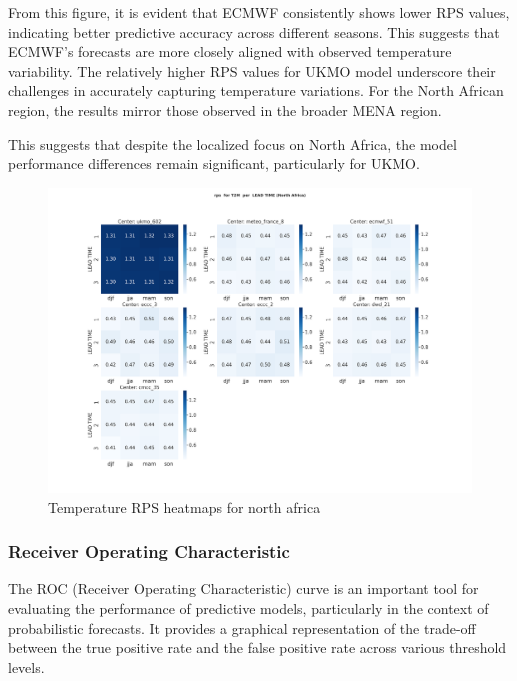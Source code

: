 From this figure, it is evident that ECMWF consistently shows lower RPS values, indicating better predictive accuracy across different seasons. This suggests that ECMWF's forecasts are more closely aligned with observed temperature variability. The relatively higher RPS values for  UKMO model underscore their challenges in accurately capturing temperature variations. 
For the North African region, the results mirror those observed in the broader MENA region.  

This suggests that despite the localized focus on North Africa, the model performance differences remain significant, particularly for UKMO. 



\begin{figure}[H]
    \centering
    \includegraphics[width=1\linewidth]{plots/prob/rps/rps_T2M_NorthAfrica.png}
    \caption{Temperature RPS  heatmaps for north africa}
\end{figure}
\subsubsection{Receiver Operating Characteristic}
The ROC (Receiver Operating Characteristic) curve is an important tool for evaluating the performance of predictive models, particularly in the context of probabilistic forecasts. It provides a graphical representation of the trade-off between the true positive rate  and the false positive rate  across various threshold levels.

